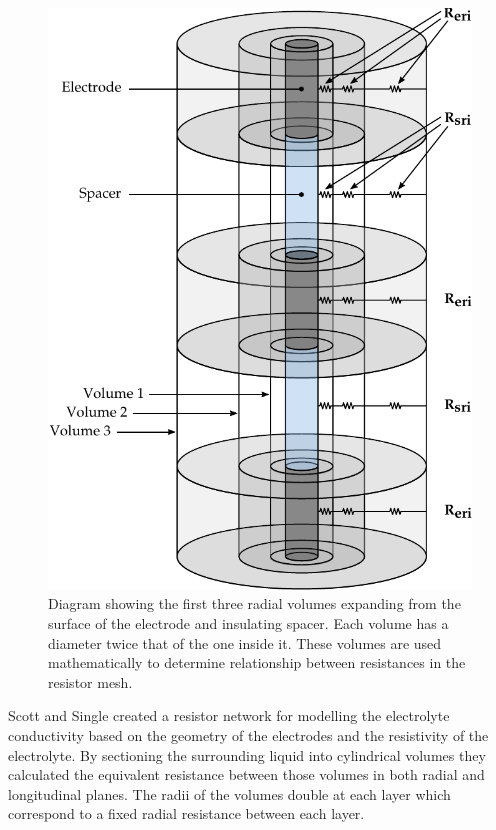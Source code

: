     \begin{figure}
      \centering
      \includegraphics{content/pt2/07-InterfaceModel/graphics/electrodeRings}
      \caption{\label{fig:electrodeRings}Diagram showing the first three radial volumes expanding from the surface of the electrode and insulating spacer. Each volume has a diameter twice that of the one inside it. These volumes are used mathematically to determine relationship between resistances in the resistor mesh.}
    \end{figure}
    Scott and Single created a resistor network for modelling the electrolyte conductivity based on the geometry of the electrodes and the resistivity of the electrolyte.
    By sectioning the surrounding liquid into cylindrical volumes they calculated the equivalent resistance between those volumes in both radial and longitudinal planes.
    The radii of the volumes double at each layer which correspond to a fixed radial resistance between each layer.
